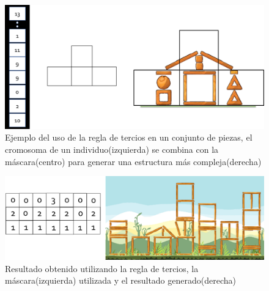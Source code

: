 \begin{figure}
  \centering
  \includegraphics[width=1.0\textwidth]{img/chromosome_thirds.png}
  \caption{Ejemplo del uso de la regla de tercios en un conjunto de piezas, el cromosoma de un individuo(izquierda) se combina con la máscara(centro) para generar una estructura más compleja(derecha)}
  \label{figure:ruleofthird_on_pieces}
\end{figure}

\begin{figure}
  \centering
  \includegraphics[width=1.0\textwidth]{img/result_example_thirds.png}
  \caption{Resultado obtenido utilizando la regla de tercios, la máscara(izquierda) utilizada y el resultado generado(derecha)}
  \label{figure:ruleofthird_on_chromosome}
\end{figure}


